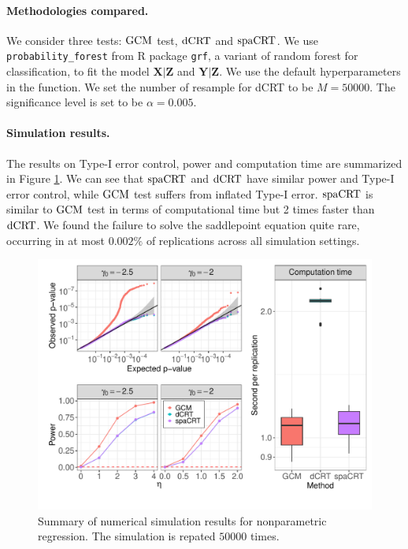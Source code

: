 \documentclass[12pt]{article}
\theoremstyle{definition}
\newcommand{\prx}{\bm X}								%
\newcommand{\prz}{\bm Z}								%
\newcommand{\pry}{{\bm Y}}								%
\newcommand{\dCRT}{\textnormal{dCRT}} 					%
\newcommand{\GCM}{\textnormal{GCM}}						%
\newcommand{\spacrt}{\textnormal{spaCRT}}               %
\begin{document}
\paragraph{Methodologies compared.}

We consider three tests: $\GCM$ test, $\dCRT$ and $\spacrt$. We use \verb|probability_forest| from R package \verb|grf|, a variant of random forest for classification, to fit the model $\prx|\prz$ and $\pry|\prz$. We use the default hyperparameters in the function. We set the number of resample for dCRT to be $M=50000$. The significance level is set to be $\alpha=0.005$.

\paragraph{Simulation results.}

The results on Type-I error control, power and computation time are summarized in Figure \ref{fig:simulation-summary-RF-classification}. We can see that $\spacrt$ and $\dCRT$ have similar power and Type-I error control, while $\GCM$ test suffers from inflated Type-I error. $\spacrt$ is similar to $\GCM$ test in terms of computational time but 2 times faster than $\dCRT$. We found the failure to solve the saddlepoint equation quite rare, occurring in at most $0.002\%$ of replications across all simulation settings.

\begin{figure}[!ht]
  \centering
  \includegraphics[width=1.0\textwidth]{figures-and-tables/simulation/RF-regression/simulation-summary.pdf}
  \caption{Summary of numerical simulation results for nonparametric regression. The simulation is repated $50000$ times.}
  \label{fig:simulation-summary-RF-classification}
\end{figure}
\end{document}
